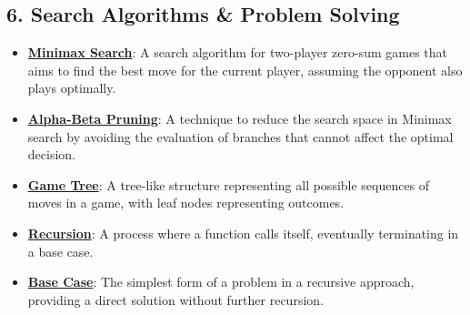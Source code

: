 \documentclass{article}%
\begin{document}
\subsection{6.  Search Algorithms \& Problem Solving}%
\label{subsec:6.SearchAlgorithmsProblemSolving}%
\begin{itemize}[leftmargin=*]%
\item \href{https://purdue.brightspace.com/d2l/common/assets/pdfjs-d2l-dist/1.0.14-legacy/web/viewer.html?file=\%2Fcontent\%2Fenforced\%2F1095467-wl.202510.CS.24300.001\%2F02L2-Intro.pdf\%3Fou\%3D1095467\&lang=en-us\&container=d2l-fileviewer-rendered-pdf\&fullscreen=d2l-fileviewer-rendered-pdf-dialog\&height=667#page=22}{\textbf{Minimax Search}}: A search algorithm for two-player zero-sum games that aims to find the best move for the current player, assuming the opponent also plays optimally.%
\item \href{https://purdue.brightspace.com/d2l/common/assets/pdfjs-d2l-dist/1.0.14-legacy/web/viewer.html?file=\%2Fcontent\%2Fenforced\%2F1095467-wl.202510.CS.24300.001\%2F02L2-Intro.pdf\%3Fou\%3D1095467\&lang=en-us\&container=d2l-fileviewer-rendered-pdf\&fullscreen=d2l-fileviewer-rendered-pdf-dialog\&height=667#page=23}{\textbf{Alpha-Beta Pruning}}: A technique to reduce the search space in Minimax search by avoiding the evaluation of branches that cannot affect the optimal decision.%
\item \href{https://purdue.brightspace.com/d2l/common/assets/pdfjs-d2l-dist/1.0.14-legacy/web/viewer.html?file=\%2Fcontent\%2Fenforced\%2F1095467-wl.202510.CS.24300.001\%2F02L2-Intro.pdf\%3Fou\%3D1095467\&lang=en-us\&container=d2l-fileviewer-rendered-pdf\&fullscreen=d2l-fileviewer-rendered-pdf-dialog\&height=667#page=11}{\textbf{Game Tree}}: A tree-like structure representing all possible sequences of moves in a game, with leaf nodes representing outcomes.%
\item \href{https://purdue.brightspace.com/d2l/common/assets/pdfjs-d2l-dist/1.0.14-legacy/web/viewer.html?file=\%2Fcontent\%2Fenforced\%2F1095467-wl.202510.CS.24300.001\%2F14L1-DepthFS.pdf\%3Fou\%3D1095467\&lang=en-us\&container=d2l-fileviewer-rendered-pdf\&fullscreen=d2l-fileviewer-rendered-pdf-dialog\&height=667#page=2}{\textbf{Recursion}}: A process where a function calls itself, eventually terminating in a base case.%
\item \href{https://purdue.brightspace.com/d2l/common/assets/pdfjs-d2l-dist/1.0.14-legacy/web/viewer.html?file=\%2Fcontent\%2Fenforced\%2F1095467-wl.202510.CS.24300.001\%2F14L1-DepthFS.pdf\%3Fou\%3D1095467\&lang=en-us\&container=d2l-fileviewer-rendered-pdf\&fullscreen=d2l-fileviewer-rendered-pdf-dialog\&height=667#page=5}{\textbf{Base Case}}: The simplest form of a problem in a recursive approach, providing a direct solution without further recursion.%

\end{itemize}
\end{document}
